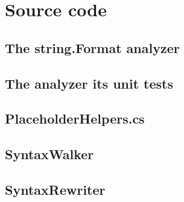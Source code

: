 \documentclass[pdftex,a4paper,12pt,twoside]{report}
\begin{document}
\tableofcontents

\appendix

\chapter{Source code}
\label{ch:sourcecode}


\section{The string.Format analyzer}


\section{The analyzer its unit tests}


\section{PlaceholderHelpers.cs}


\section{SyntaxWalker}


\section{SyntaxRewriter}

\end{document}
